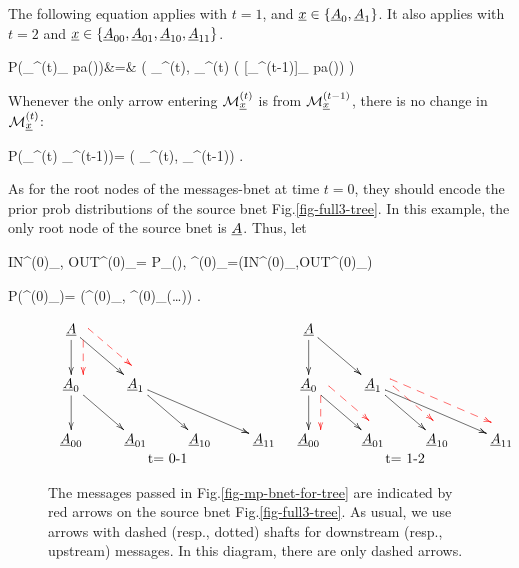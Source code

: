 The following equation
applies with  $t=1$,
and ${\underline{x}}\in\{{\underline{A}}_0, {\underline{A}}_1\}$.
It also applies with
 $t=2$ and ${\underline{x}}\in\{
 {\underline{A}}_{00},{\underline{A}}_{01},
{\underline{A}}_{10},{\underline{A}}_{11}\}$.

\beqa\color{blue}
P(\calm_{\rvx}^{(t)}_
{\rva\in pa(\rvx)\cup \rvx})&=&\color{blue}
\delta(
\calm_{\rvx}^{(t)},
\calm_{\rvx}^{(t)}
( 
[\calm_{\rva}^{(t-1)}]_
{\rva\in pa(\rvx)\cup   \rvx})
)
\eeqa

Whenever the only arrow
entering ${\cal M}_{{\underline{x}}}^{(t)}$
is from ${\cal M}_{{\underline{x}}}^{(t-1)}$,
there is no change in ${\cal M}_{{\underline{x}}}^{(t)}$:

\beq\color{blue}
P(\calm_{\rvx}^{(t)}\cond
\calm_{\rvx}^{(t-1)})=
\delta(
\calm_{\rvx}^{(t)},
\calm_{\rvx}^{(t-1)})
\;.
\eeq

As for the root nodes
of the messages-bnet  at time $t=0$,
they should encode the prior
prob  distributions
of the source bnet Fig.\ref{fig-full3-tree}.
In this example, the only root node 
of the source bnet is ${\underline{A}}$. Thus, let

\beq
IN^{(0)}_,\;\;
OUT^{(0)}_\rvA= P_\rvA(\cdot),\;\;
\calm^{(0)}_\rvA=(IN^{(0)}_\rvA,OUT^{(0)}_\rvA)
\eeq

\beq\color{blue}
P(\calm^{(0)}_\rvA)=
\delta(\calm^{(0)}_\rvA,
\calm^{(0)}_\rvA(\ldots))
\;.
\eeq


\begin{figure}[h!]
\centering
$$
\begin{array}{cc}
\xymatrix{
\rvA\ar[d]\ar[dr]
\ar@[red]@{-->}@<2ex>[d]
\ar@[red]@{-->}@<2ex>[dr]
\\
\rvA_{0}\ar[d]\ar[dr]
&\rvA_{1}\ar[dr]\ar[drr]
\\
\rvA_{00}
&\rvA_{01}
&\rvA_{10}
&\rvA_{11}
}
&
\xymatrix{
\rvA\ar[d]\ar[dr]
\\
\rvA_{0}\ar[d]\ar[dr]
\ar@[red]@{-->}@<2ex>[d]
\ar@[red]@{-->}@<2ex>[dr]
&\rvA_{1}\ar[dr]\ar[drr]
\ar@[red]@{-->}@<2ex>[dr]
\ar@[red]@{-->}@<2ex>[drr]
\\
\rvA_{00}
&\rvA_{01}
&\rvA_{10}
&\rvA_{11}
}
\\
\text{t= 0-1}&\text{t= 1-2}
\end{array}
$$
\caption{
The messages passed in 
Fig.\ref{fig-mp-bnet-for-tree}
are indicated by red arrows
on the source bnet 
Fig.\ref{fig-full3-tree}.
As usual, we use arrows with
dashed (resp., dotted) shafts for
downstream (resp., upstream) messages. 
In this diagram, there are only
dashed arrows.
}
\label{fig-full3-tree-messages}
\end{figure}


